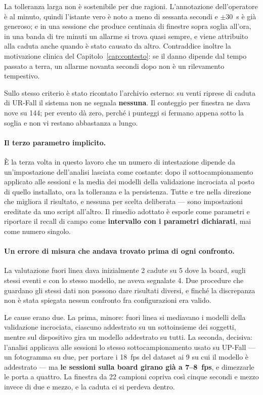 La tolleranza larga non è sostenibile per due ragioni. L'annotazione dell'operatore è al minuto, quindi l'istante vero è noto a meno di sessanta secondi e $\pm 30$~s è già generoso; e in una sessione che produce centinaia di finestre sopra soglia all'ora, in una banda di tre minuti un allarme si trova quasi sempre, e viene attribuito alla caduta anche quando è stato causato da altro. Contraddice inoltre la motivazione clinica del Capitolo~\ref{cap:contesto}: se il danno dipende dal tempo passato a terra, un allarme novanta secondi dopo non è un rilevamento tempestivo.

Sullo stesso criterio è stato ricontato l'archivio esterno: su venti riprese di caduta di UR-Fall il sistema non ne segnala \textbf{nessuna}. Il conteggio per finestra ne dava nove su 144; per evento dà zero, perché i punteggi si fermano appena sotto la soglia e non vi restano abbastanza a lungo.

\paragraph{Il terzo parametro implicito.} È la terza volta in questo lavoro che un numero di intestazione dipende da un'impostazione dell'analisi lasciata come costante: dopo il sottocampionamento applicato alle sessioni e la media dei modelli della validazione incrociata al posto di quello installato, ora la tolleranza e la persistenza. Tutte e tre nella direzione che migliora il risultato, e nessuna per scelta deliberata --- sono impostazioni ereditate da uno script all'altro. Il rimedio adottato è esporle come parametri e riportare il recall di campo come \textbf{intervallo con i parametri dichiarati}, mai come numero singolo.

\paragraph{Un errore di misura che andava trovato prima di ogni confronto.} La valutazione fuori linea dava inizialmente 2 cadute su 5 dove la board, sugli stessi eventi e con lo stesso modello, ne aveva segnalate 4. Due procedure che guardano gli stessi dati non possono dare risultati diversi, e finché la discrepanza non è stata spiegata nessun confronto fra configurazioni era valido.

Le cause erano due. La prima, minore: fuori linea si mediavano i modelli della validazione incrociata, ciascuno addestrato su un sottoinsieme dei soggetti, mentre sul dispositivo gira un modello addestrato su tutti. La seconda, decisiva: l'analisi applicava alle sessioni lo stesso sottocampionamento usato su UP-Fall --- un fotogramma su due, per portare i 18~fps del dataset ai 9 su cui il modello è addestrato --- ma \textbf{le sessioni sulla board girano già a 7--8~fps}, e dimezzarle le porta a quattro. La finestra da 22 campioni copriva così cinque secondi e mezzo invece di due e mezzo, e la caduta ci si perdeva dentro.

